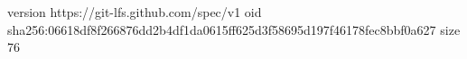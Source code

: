version https://git-lfs.github.com/spec/v1
oid sha256:06618df8f266876dd2b4df1da0615ff625d3f58695d197f46178fec8bbf0a627
size 76
